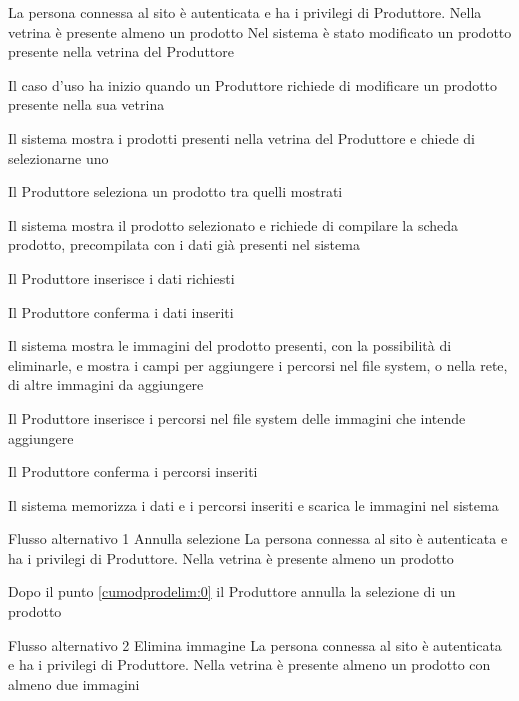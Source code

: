{}
{La persona connessa al sito è autenticata e ha i privilegi di Produttore. Nella vetrina è presente almeno un prodotto}%
{Nel sistema è stato modificato un prodotto presente nella vetrina del Produttore}
{\begin{enumCU}
		\item Il caso d'uso ha inizio quando un Produttore richiede di modificare un prodotto presente nella sua vetrina
		\item Il sistema mostra i prodotti presenti nella vetrina del Produttore e chiede di selezionarne uno\label{cumodprodelim:0}
		\item Il Produttore seleziona un prodotto tra quelli mostrati 
		\item Il sistema mostra il prodotto selezionato e richiede di compilare la scheda prodotto, precompilata con i dati già presenti nel sistema
		\item Il Produttore inserisce i dati richiesti \label{cumodprodelim:1}
		\item Il Produttore conferma i dati inseriti
		\item Il sistema mostra le immagini del prodotto presenti, con la possibilità di eliminarle, e mostra i campi per aggiungere i percorsi nel file system, o nella rete, di altre immagini da aggiungere \label{cumodprodelim:3}
		\item Il Produttore inserisce i percorsi nel file system delle immagini che intende aggiungere
		\item Il Produttore conferma i percorsi inseriti \label{cumodprodelim:2}
		\item Il sistema memorizza i dati e i percorsi inseriti e scarica le immagini nel sistema
	\end{enumCU}} %
%
{Flusso alternativo 1}%
{Annulla selezione}%
{La persona connessa al sito è autenticata e ha i privilegi di Produttore. Nella vetrina è presente almeno un prodotto}
{\postNulle}%
{\begin{enumCU}
		\item Dopo il punto \ref{cumodprodelim:0} il Produttore annulla la selezione di un prodotto
\end{enumCU}}%
%
{Flusso alternativo 2}%
{Elimina immagine}%
{La persona connessa al sito è autenticata e ha i privilegi di Produttore. Nella vetrina è presente almeno un prodotto con almeno due immagini}
